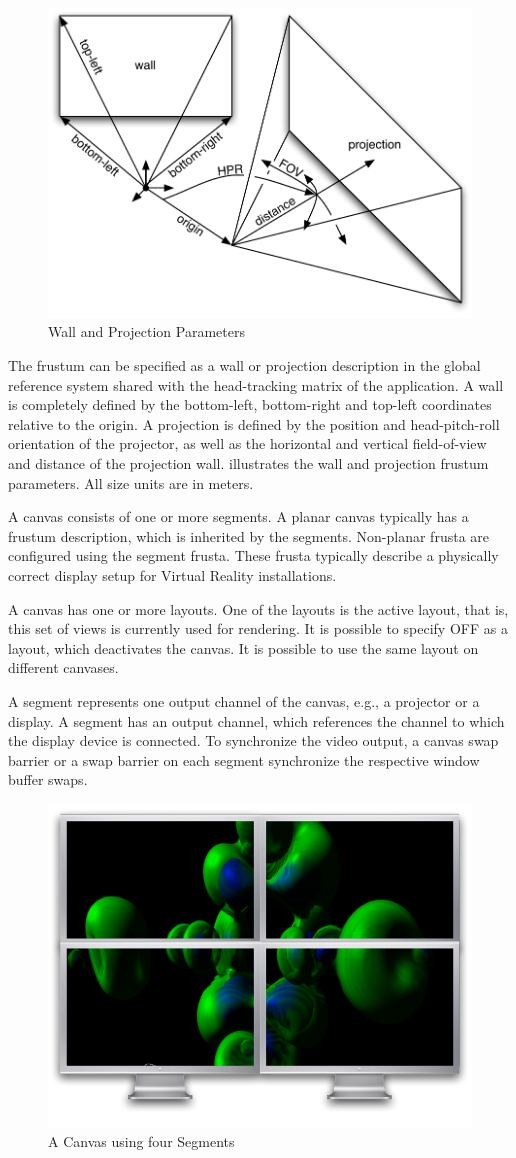 \begin{figure}
 \includegraphics[width=.618\textwidth]{images/frusta.pdf}
 {\caption{\label{fFrusta}Wall and Projection Parameters}}
\end{figure}

The frustum can be specified as a wall or projection description in the global
reference system shared with the head-tracking matrix of the application. A
wall is completely defined by the bottom-left, bottom-right and top-left
coordinates relative to the origin. A projection is defined by the position and
head-pitch-roll orientation of the projector, as well as the horizontal and
vertical field-of-view and distance of the projection wall. 
illustrates the wall and projection frustum parameters. All size units are in
meters.

A canvas consists of one or more segments. A planar canvas typically has a
frustum description, which is inherited by the segments. Non-planar frusta are
configured using the segment frusta. These frusta typically describe a
physically correct display setup for Virtual Reality installations.

A canvas has one or more layouts. One of the layouts is the active layout, that
is, this set of views is currently used for rendering. It is possible to
specify \textsf{OFF} as a layout, which deactivates the canvas. It is possible
to use the same layout on different canvases.

A \textsf{segment} represents one output channel of the canvas, e.g., a
projector or a display. A segment has an output channel, which references the
channel to which the display device is connected. To synchronize the video
output, a canvas swap barrier or a swap barrier on each segment synchronize the
respective window buffer swaps.

\begin{figure}
  \includegraphics[width=.382\textwidth]{images/canvas.pdf}
  {\caption{\label{fCanvas}A Canvas using four Segments}}
\end{figure}

